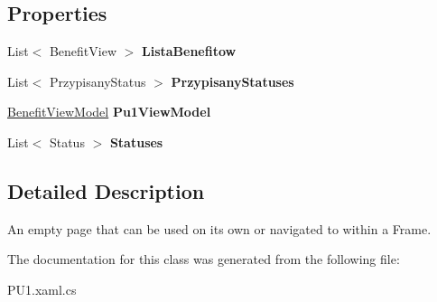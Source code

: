 \subsection*{Properties}
\begin{DoxyCompactItemize}
\item 
\hypertarget{class_ocena_klientow_1_1_view_1_1_p_u1_a7cfd0ef45a2f2c6f4e668e59521edefc}{}\label{class_ocena_klientow_1_1_view_1_1_p_u1_a7cfd0ef45a2f2c6f4e668e59521edefc} 
List$<$ Benefit\+View $>$ {\bfseries Lista\+Benefitow}
\item 
\hypertarget{class_ocena_klientow_1_1_view_1_1_p_u1_a9522ddc60f60a2d3bdce41e6ebefcda0}{}\label{class_ocena_klientow_1_1_view_1_1_p_u1_a9522ddc60f60a2d3bdce41e6ebefcda0} 
List$<$ Przypisany\+Status $>$ {\bfseries Przypisany\+Statuses}
\item 
\hypertarget{class_ocena_klientow_1_1_view_1_1_p_u1_a9bfb645cffbf6015593de4d98dea5575}{}\label{class_ocena_klientow_1_1_view_1_1_p_u1_a9bfb645cffbf6015593de4d98dea5575} 
\hyperlink{class_ocena_klientow_1_1_view_model_1_1_benefit_view_model}{Benefit\+View\+Model} {\bfseries Pu1\+View\+Model}
\item 
\hypertarget{class_ocena_klientow_1_1_view_1_1_p_u1_a9aae83a0374d5865997ab8503b29eeef}{}\label{class_ocena_klientow_1_1_view_1_1_p_u1_a9aae83a0374d5865997ab8503b29eeef} 
List$<$ Status $>$ {\bfseries Statuses}
\end{DoxyCompactItemize}


\subsection{Detailed Description}
An empty page that can be used on its own or navigated to within a Frame. 



The documentation for this class was generated from the following file\+:\begin{DoxyCompactItemize}
\item 
P\+U1.\+xaml.\+cs\end{DoxyCompactItemize}
